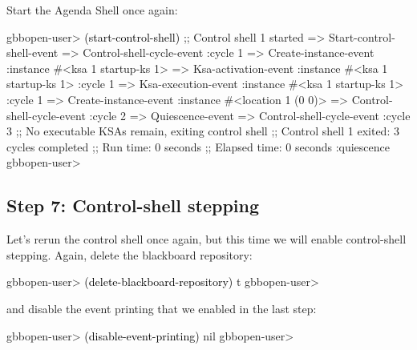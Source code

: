 \documentclass[10pt,twoside,english,pdftex]{article}
\begin{document}
%
%
Start the Agenda Shell once again:
%
\W\supp
\begin{example}
\textcolor{darkergray}{%
  gbbopen-user> \textcolor{black}{(start-control-shell)}
  ;; Control shell 1 started
  => Start-control-shell-event
  => Control-shell-cycle-event
       :cycle 1
  => Create-instance-event
       :instance #<ksa 1 startup-ks 1>
  => Ksa-activation-event
       :instance #<ksa 1 startup-ks 1>
       :cycle 1
  => Ksa-execution-event
       :instance #<ksa 1 startup-ks 1>
       :cycle 1
  => Create-instance-event
       :instance #<location 1 (0 0)>
  => Control-shell-cycle-event
       :cycle 2
  => Quiescence-event
  => Control-shell-cycle-event
       :cycle 3
  ;; No executable KSAs remain, exiting control shell
  ;; Control shell 1 exited: 3 cycles completed
  ;; Run time: 0 seconds
  ;; Elapsed time: 0 seconds
  :quiescence
  gbbopen-user>}
\end{example}

\subsection*{Step 7: Control-shell stepping}

%
%
Let's rerun the control shell once again, but this time we will enable
control-shell stepping. Again, delete the blackboard repository:
%
\W\supp
\begin{example}
\textcolor{darkergray}{%
  gbbopen-user> \textcolor{black}{(delete-blackboard-repository)}
  t
  gbbopen-user>}
\end{example}
%
and disable the event printing that we enabled in the last step:
%
\W\supp\notpretop
\begin{example}
\textcolor{darkergray}{%
  gbbopen-user> \textcolor{black}{(disable-event-printing)}
  nil
  gbbopen-user>}
\end{example}
\end{document}
